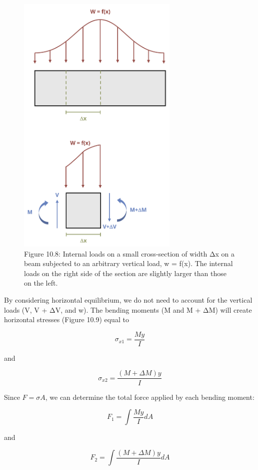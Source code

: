 \documentclass[
  letterpaper,
  DIV=11,
  numbers=noendperiod]{scrreprt}
\theoremstyle{definition}
\theoremstyle{remark}
\begin{document}
\begin{figure}[H]

{\centering \includegraphics[width=3.03125in,height=\textheight]{images/CH10 PNGs/figure 10.8.png}

}

\caption{Figure 10.8: Internal loads on a small cross-section of width
Δx on a beam subjected to an arbitrary vertical load, w = f(x). The
internal loads on the right side of the section are slightly larger than
those on the left.}

\end{figure}%

By considering horizontal equilibrium, we do not need to account for the
vertical loads (V, V + ΔV, and w). The bending moments (M and M + ΔM)
will create horizontal stresses (Figure 10.9) equal to

\[
\sigma_{x 1}=\frac{M y}{I}
\]

and

\[
\sigma_{x 2}=\frac{(M+\Delta M) y}{I}
\]

Since \(F=\sigma A\), we can determine the total force applied by each
bending moment:

\[
F_1=\int \frac{M y}{I} d A
\]

and

\[
F_2=\int \frac{(M+\Delta M) y}{I} d A
\]
\end{document}
